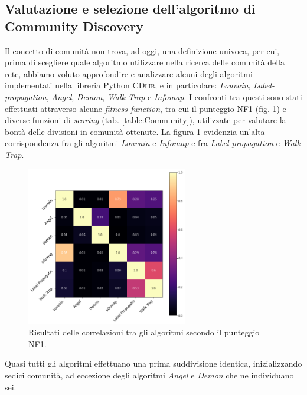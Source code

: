     \subsection{Valutazione e selezione dell'algoritmo di Community Discovery}\label{val}
    
    Il concetto di comunità non trova, ad oggi, una definizione univoca, per cui, prima di scegliere quale algoritmo utilizzare nella ricerca delle comunità della rete, abbiamo voluto approfondire e analizzare alcuni degli algoritmi implementati nella libreria Python {\scshape CDlib}, e in particolare: \textit{Louvain}, \textit{Label-propagation}, \textit{Angel}, \textit{Demon}, \textit{Walk Trap} e 
    \textit{Infomap}.  
    I confronti tra questi sono stati effettuati attraverso alcune \textit{fitness function}, tra cui il punteggio NF1 (fig. \ref{heatmap_algoritms}) e diverse funzioni di \textit{scoring} (tab. \ref{table:Community}), utilizzate per valutare la bontà delle divisioni in comunità ottenute.
    La figura \ref{heatmap_algoritms} evidenzia un'alta corrispondenza fra gli algoritmi \textit{Louvain} e \textit{Infomap} e fra \textit{Label-propagation} e \textit{Walk Trap}.
    
    \begin{figure}
        \centering
        \includegraphics[width=7cm] {4_Community_discovery/heatmap.png}
        \caption{Risultati delle correlazioni tra gli algoritmi secondo il punteggio NF1.}
        \label{heatmap_algoritms}
    \end{figure}
    
   Quasi tutti gli algoritmi effettuano una prima suddivisione identica, inizializzando sedici comunità, ad eccezione degli algoritmi \textit{Angel} e \textit{Demon} che ne individuano sei.
   
